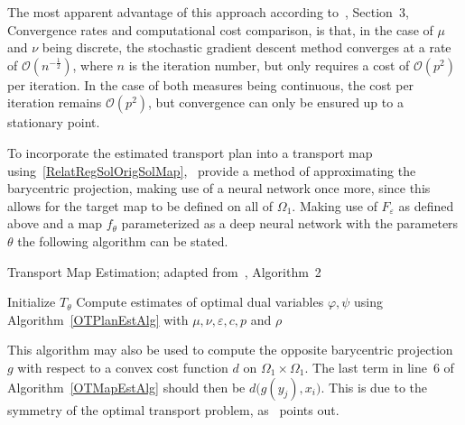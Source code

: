 The most apparent advantage of this approach according to~\cite{Seg2018}, Section~3, Convergence rates and computational cost comparison, is that, in the case of $\mu$ and $\nu$ being discrete, the stochastic gradient descent method converges at a rate of $\mathcal{O}\left( n^{-\frac{1}{2}} \right)$, where $n$ is the iteration number, but only requires a cost of $\mathcal{O}(p^2)$ per iteration. In the case of both measures being continuous, the cost per iteration remains $\mathcal{O}(p^2)$, but convergence can only be ensured up to a stationary point.

To incorporate the estimated transport plan into a transport map using\ \ref{RelatRegSolOrigSolMap},~\cite{Seg2018} provide a method of approximating the barycentric projection, making use of a neural network once more, since this allows for the target map to be defined on all of $\Omega_1$. Making use of $F_\varepsilon$ as defined above and a map $f_\theta$ parameterized as a deep neural network with the parameters $\theta$ the following algorithm can be stated.

\begin{algorithm}\label{OTMapEstAlg}
	\caption{Transport Map Estimation; adapted from~\cite{Seg2018}, Algorithm~2}
	Initialize $T_\theta$\;
	Compute estimates of optimal dual variables $\varphi, \psi$ using Algorithm~\ref{OTPlanEstAlg} with $\mu, \nu, \varepsilon, c, p$ and $\rho$\;
\end{algorithm}

This algorithm may also be used to compute the opposite barycentric projection $g$ with respect to a convex cost function $d$ on $\Omega_1 \times \Omega_1$. The last term in line~6 of Algorithm~\ref{OTMapEstAlg} should then be $d\big( g(y_j), x_i \big)$. This is due to the symmetry of the optimal transport problem, as~\cite{Seg2018} points out.